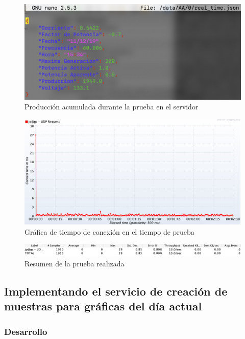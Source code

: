 \begin{figure}[H]
	\centering
	\includegraphics[scale=.3]{Capitulo5/images/udp_test_production.png}
	\caption{Producción acumulada durante la prueba en el servidor}
	\label{fig:udptestjson}
\end{figure} 

\begin{figure}[H]
	\centering
	\includegraphics[scale=.3]{Capitulo5/images/udp_test_connect.png}
	\caption{Gráfica de tiempo de conexión en el tiempo de prueba}
	\label{fig:udpconnect}
\end{figure} 

\begin{figure}[H]
	\centering
	\includegraphics[scale=.3]{Capitulo5/images/udp_test_summary.png}
	\caption{Resumen de la prueba realizada}
	\label{fig:udpsummary}
\end{figure} 

\subsection{Implementando el servicio de creación de muestras para  gráficas del día actual}

\subsubsection{Desarrollo}

